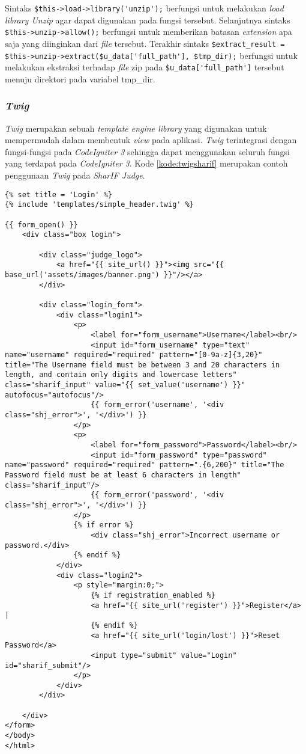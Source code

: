 Sintaks \verb|$this->load->library('unzip');| berfungsi untuk melakukan \textit{load} \textit{library Unzip} agar dapat digunakan pada fungsi tersebut. Selanjutnya sintaks \verb|$this->unzip->allow();| berfungsi untuk memberikan batasan \textit{extension} apa saja yang diinginkan dari \textit{file} tersebut. Terakhir sintaks \verb|$extract_result = $this->unzip->extract($u_data['full_path'], $tmp_dir);| berfungsi untuk melakukan ekstraksi terhadap \textit{file} zip pada \verb|$u_data['full_path']| tersebut menuju direktori pada variabel tmp\_dir.

\subsubsection{\textit{Twig}}
\textit{Twig} merupakan sebuah \textit{template engine library} yang digunakan untuk mempermudah dalam membentuk \textit{view} pada aplikasi. \textit{Twig} terintegrasi dengan fungsi-fungsi pada \textit{CodeIgniter 3} sehingga dapat menggunakan seluruh fungsi yang terdapat pada \textit{CodeIgniter 3}. Kode \ref{kode:twigsharif} merupakan contoh penggunaan \textit{Twig} pada \textit{SharIF Judge}.
\begin{lstlisting}[caption=Contoh \textit{view} menggunakan \textit{library Twig}, label=kode:twigsharif]
{% set title = 'Login' %}
{% include 'templates/simple_header.twig' %}

{{ form_open() }}
	<div class="box login">

		<div class="judge_logo">
			<a href="{{ site_url() }}"><img src="{{ base_url('assets/images/banner.png') }}"/></a>
		</div>

		<div class="login_form">
			<div class="login1">
				<p>
					<label for="form_username">Username</label><br/>
					<input id="form_username" type="text" name="username" required="required" pattern="[0-9a-z]{3,20}" title="The Username field must be between 3 and 20 characters in length, and contain only digits and lowercase letters" class="sharif_input" value="{{ set_value('username') }}" autofocus="autofocus"/>
					{{ form_error('username', '<div class="shj_error">', '</div>') }}
				</p>
				<p>
					<label for="form_password">Password</label><br/>
					<input id="form_password" type="password" name="password" required="required" pattern=".{6,200}" title="The Password field must be at least 6 characters in length" class="sharif_input"/>
					{{ form_error('password', '<div class="shj_error">', '</div>') }}
				</p>
				{% if error %}
					<div class="shj_error">Incorrect username or password.</div>
				{% endif %}
			</div>
			<div class="login2">
				<p style="margin:0;">
					{% if registration_enabled %}
					<a href="{{ site_url('register') }}">Register</a> |
					{% endif %}
					<a href="{{ site_url('login/lost') }}">Reset Password</a>
					<input type="submit" value="Login" id="sharif_submit"/>
				</p>
			</div>
		</div>

	</div>
</form>
</body>
</html>
\end{lstlisting}

